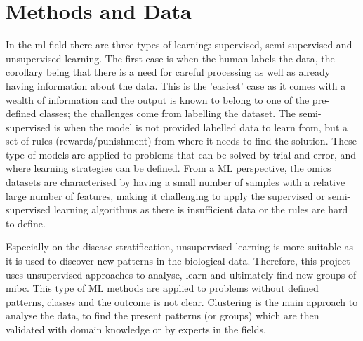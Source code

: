 \section{Methods and Data} \label{s:lit:computational}

\vspace{3mm}
\vspace{3mm}

In the \acrfull{ml} field there are three types of learning: supervised, semi-supervised and unsupervised learning. The first case is when the human labels the data, the corollary being that there is a need for careful processing as well as already having information about the data. This is the 'easiest' case as it comes with a wealth of information and the output is known to belong to one of the pre-defined classes; the challenges come from labelling the dataset. The semi-supervised is when the model is not provided labelled data to learn from, but a set of rules (rewards/punishment) from where it needs to find the solution. These type of models are applied to problems that can be solved by trial and error, and where learning strategies can be defined. From a ML perspective, the omics datasets are characterised by having a small number of samples with a relative large number of features, making it challenging to apply the supervised or semi-supervised learning algorithms as there is insufficient data or the rules are hard to define. 

Especially on the disease stratification, unsupervised learning is more suitable as it is used to discover new patterns in the biological data. Therefore, this project uses unsupervised approaches to analyse, learn and ultimately find new groups of \acrfull{mibc}. This type of ML methods are applied to problems without defined patterns, classes and the outcome is not clear. Clustering is the main approach to analyse the data, to find the present patterns (or groups) which  are then validated with domain knowledge or by experts in the fields. 

